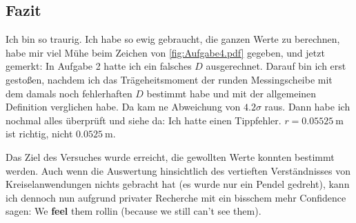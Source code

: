 \subsection{Fazit}
Ich bin so traurig. Ich habe so ewig gebraucht, die ganzen Werte zu berechnen, habe mir viel Mühe beim Zeichen von \cref{fig:Aufgabe4.pdf} gegeben, und jetzt gemerkt: In Aufgabe 2 hatte ich ein falsches \(D\) ausgerechnet. Darauf bin ich erst gestoßen, nachdem ich das Trägeheitsmoment der runden Messingscheibe mit dem damals noch fehlerhaften \(D\) bestimmt habe und mit der allgemeinen Definition verglichen habe. Da kam ne Abweichung von \(4.2\sigma\) raus. Dann habe ich nochmal alles überprüft und siehe da: Ich hatte einen Tippfehler. \(r=\qty{0.05525}{\m}\) ist richtig, nicht \(\qty{0.0525}{\m}\).

Das Ziel des Versuches wurde erreicht, die gewollten Werte konnten bestimmt werden. Auch wenn die Auswertung hinsichtlich des vertieften Verständnisses von Kreiselanwendungen nichts gebracht hat (es wurde nur ein Pendel gedreht), kann ich dennoch nun aufgrund privater Recherche mit ein bisschem mehr Confidence sagen: We \textbf{feel} them rollin (because we still can't see them).
